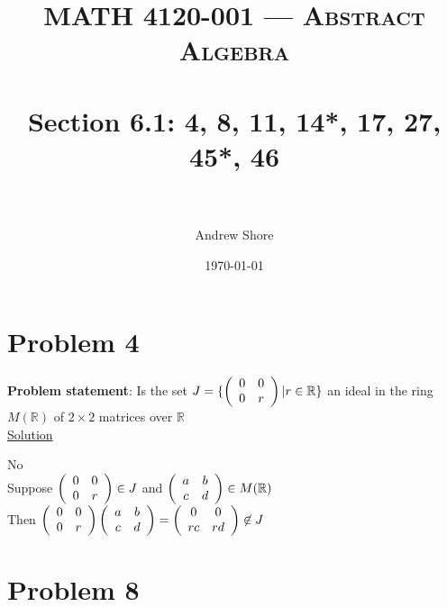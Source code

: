 \documentclass{article} %
\title{ 
\normalfont \normalsize 
\textsc{MATH 4120-001 --- Abstract Algebra} \\
\horrule{0.5pt} \\[0cm] %
\huge Section  6.1: 4, 8, 11, 14*, 17, 27, 45*, 46\\ %
\horrule{2pt} \\[0cm] %
}
\author{Andrew Shore} %
\date{\normalsize\today} %
\begin{document}
\maketitle %

\section*{Problem 4}


\textbf{Problem statement}: Is the set $J = \{\left( \begin{array}{c c} 0 & 0 \\ 0 & r\end{array}\right)| r \in \mathbb{R}\}$ an ideal in the ring $M(\mathbb{R})$ of $2\times2$ matrices over $\mathbb{R}$
\\

\underline{Solution}
\begin{addmargin}[1em]{0em}
No
\\Suppose $\left( \begin{array}{c c} 0 & 0 \\ 0 & r\end{array}\right) \in J$ and $\left( \begin{array}{c c} a & b \\ c & d\end{array}\right) \in M(\mathbb{R})$
\\Then $\left( \begin{array}{c c} 0 & 0 \\ 0 & r\end{array}\right)\left( \begin{array}{c c} a & b \\ c & d\end{array}\right) = \left( \begin{array}{c c} 0 & 0 \\ rc & rd\end{array}\right) \not\in J$
\end{addmargin}

\newpage
\section*{Problem 8}
\end{document}
